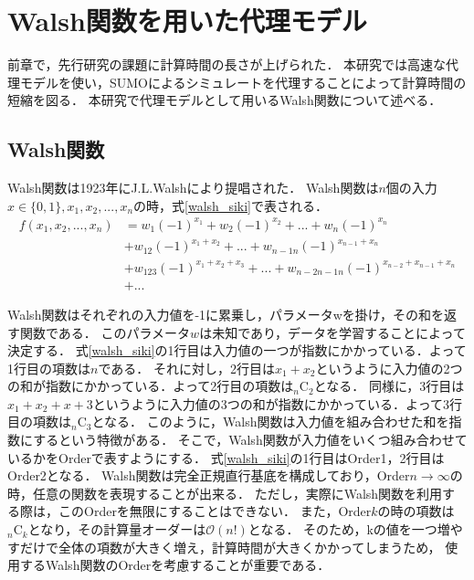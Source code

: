 \documentclass[main]{subfiles}
\begin{document}
\chapter{Walsh関数を用いた代理モデル}
    前章で，先行研究の課題に計算時間の長さが上げられた．
    本研究では高速な代理モデルを使い，SUMOによるシミュレートを代理することによって計算時間の短縮を図る．
    本研究で代理モデルとして用いるWalsh関数について述べる．

    \section{Walsh関数}   
    Walsh関数\cite{walsh}は1923年にJ.L.Walshにより提唱された．
    Walsh関数は$n$個の入力$x \in \{0, 1\}, x_1, x_2, ..., x_n$の時，式\ref{walsh_siki}で表される．
    \begin{equation}
        \begin{split}
            f(x_1, x_2, ..., x_n) &= w_1(-1)^{x_1} + w_2(-1)^{x_2} + ... + w_n(-1)^{x_n} \\
            &+ w_{12}(-1)^{x_1+x_2} + ... + w_{n-1n}(-1)^{x_{n-1}+x_n} \\
            &+ w_{123}(-1)^{x_1+x_2+x_3} + ... + w_{n-2n-1n}(-1)^{x_{n-2}+x_{n-1}+x_n} \\
            &+ ...
            \label{walsh_siki}
        \end{split}
    \end{equation}
    
    Walsh関数はそれぞれの入力値を-1に累乗し，パラメータwを掛け，その和を返す関数である．
    このパラメータ$w$は未知であり，データを学習することによって決定する．
    式\ref{walsh_siki}の1行目は入力値の一つが指数にかかっている．よって1行目の項数は$n$である．
    それに対し，2行目は$x_1+x_2$というように入力値の2つの和が指数にかかっている．よって2行目の項数は${}_n \mathrm{C}_2$となる．
    同様に，3行目は$x_1+x_2+x+3$というように入力値の3つの和が指数にかかっている．よって3行目の項数は${}_n \mathrm{C}_3$となる．
    このように，Walsh関数は入力値を組み合わせた和を指数にするという特徴がある．
    そこで，Walsh関数が入力値をいくつ組み合わせているかをOrderで表すようにする．
    式\ref{walsh_siki}の1行目はOrder1，2行目はOrder2となる．
    Walsh関数は完全正規直行基底を構成しており，Order$n\to \infty$の時，任意の関数を表現することが出来る．
    ただし，実際にWalsh関数を利用する際は，このOrderを無限にすることはできない．
    また，Order$k$の時の項数は${}_n \mathrm{C}_k$となり，その計算量オーダーは$\mathcal{O}(n!)$となる．
    そのため，kの値を一つ増やすだけで全体の項数が大きく増え，計算時間が大きくかかってしまうため，
    使用するWalsh関数のOrderを考慮することが重要である．
\end{document}
